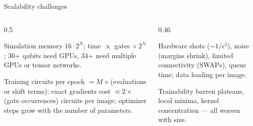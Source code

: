 \documentclass[aspectratio=169,11pt]{beamer}
\begin{document}
\begin{frame}[label=fScaleCh]{Scalability challenges}
  \begin{columns}[T]
    \begin{column}{0.5\textwidth}
      \small
      \begin{block}{Simulation}
        \scriptsize memory $16\cdot2^N$; time $\propto$ gates $\times\,2^N$; 30+ qubits need GPUs, 34+ need multiple GPUs or tensor networks.
      \end{block}
      \begin{block}{Training}
        \scriptsize circuits per epoch $= M\times$(evaluations or shift terms); exact gradients cost $\approx 2\times$(gate occurrences) circuits per image;
        optimizer steps grow with the number of parameters.
      \end{block}
    \end{column}
    \begin{column}{0.46\textwidth}
      \begin{block}{Hardware}
        \scriptsize shots ($\sim 1/\epsilon^2$), noise (margins shrink), limited connectivity (SWAPs), queue time; data loading per image.
      \end{block}
      \begin{block}{Trainability}
        \scriptsize barren plateaus, local minima, kernel concentration --- all worsen with size.
      \end{block}
    \end{column}
  \end{columns}
\end{frame}
\end{document}

